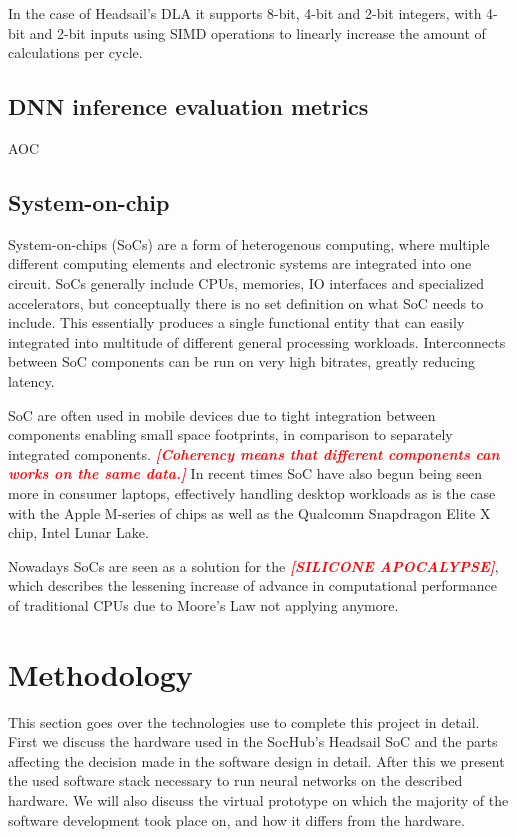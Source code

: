 \documentclass[12pt,a4paper,english
]{tunithesis}
\newcommand{\fixthis}[1]{\textbf{\textit{\textcolor{red}{[#1]}}}}
\begin{document}
In the case of Headsail's DLA it supports 8-bit, 4-bit and 2-bit integers, with 4-bit and 2-bit inputs using SIMD operations to linearly increase the amount of calculations per cycle.

\section{DNN inference evaluation metrics}
AOC

\section{System-on-chip}
System-on-chips (SoCs) are a form of heterogenous computing, where multiple different computing elements and electronic systems are integrated into one circuit.
SoCs generally include CPUs, memories, IO interfaces and specialized accelerators, but conceptually there is no set definition on what SoC needs to include.
This essentially produces a single functional entity that can easily integrated into multitude of different general processing workloads.
Interconnects between SoC components can be run on very high bitrates, greatly reducing latency.

SoC are often used in mobile devices due to tight integration between components enabling small space footprints, in comparison to separately integrated components.
\fixthis{Coherency means that different components can works on the same data.}
In recent times SoC have also begun being seen more in consumer laptops, effectively handling desktop workloads as is the case with the Apple M-series of chips as well as the Qualcomm Snapdragon Elite X chip, Intel Lunar Lake.

Nowadays SoCs are seen as a solution for the \fixthis{SILICONE APOCALYPSE}, which describes the lessening increase of advance in computational performance of traditional CPUs due to Moore's Law not applying anymore.

\chapter{Methodology}
This section goes over the technologies use to complete this project in detail. First we discuss the hardware used in the SocHub's Headsail SoC and the parts affecting the decision made in the software design in detail. After this we present the used software stack necessary to run neural networks on the described hardware. We will also discuss the virtual prototype on which the majority of the software development took place on, and how it differs from the hardware.
\label{ch:methodology}
\end{document}
